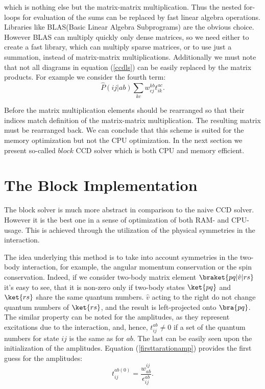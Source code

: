 \documentclass[twoside,english]{uiofysmaster}
\begin{document}
which is nothing else but the matrix-matrix multiplication. Thus the nested for-loops for evaluation of the sums can be replaced by fast linear algebra operations. Libraries like BLAS(Basic Linear Algebra Subprograms) are the obvious choice. However BLAS can multiply quickly only dense matrices, so we need either to create a fast library, which can multiply sparse matrices, or to use just a summation, instead of matrix-matrix multiplications.
Additionally we must note that not all diagrams in equation (\ref{ccdls}) can be easily replaced by the matrix products. For example we consider the fourth term:
\[
\hat{P}(ij|ab)\sum_{kc}w_{cj}^{kb}t_{ik}^{ac}.
\]

Before the matrix multiplication elements should be rearranged so that their indices match definition of the matrix-matrix multiplication. The resulting matrix must be rearranged back. We can conclude that this scheme is suited for the memory optimization but not the CPU optimization. In the next section we present so-called $block$ CCD solver which is both CPU and memory efficient. 

\section{The Block Implementation}
The block solver is much more abstract in comparison to the naive CCD solver. However it is the best one in a sense of optimization of both RAM- and CPU-usage. This is achieved through the utilization of the physical symmetries in the interaction.

The idea underlying this method is to take into account symmetries in the two-body interaction, for example, the angular momentum conservation or the spin conservation. Indeed, if we consider two-body matrix element $\braket{pq|\hat{v}|rs}$ it's easy to see, that it is non-zero only if two-body states $\ket{pq}$ and $\ket{rs}$ share the same quantum numbers. $\hat{v}$ acting to the right do not change quantum numbers of $\ket{rs}$, and the result is left-projected onto $\bra{pq}$. The similar property can be noted for the amplitudes, as they represent excitations due to the interaction, and, hence, $t_{ij}^{ab} \neq 0$ if a set of the quantum numbers for state $ij$ is the same as for $ab$. The last can be easily seen upon the initialization of the amplitudes. Equation (\ref{firsttarationamp}) provides the first guess for the amplitudes:
\begin{equation}\label{ampnonzero}
t_{ij}^{ab(0)} = \frac{w_{ab}^{ij}}{\epsilon_{ij}^{ab}}.
\end{equation}
\end{document}

